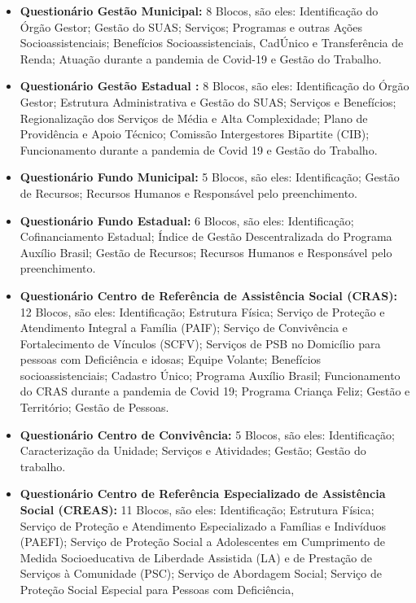 \documentclass[
  brazilian]{report}
\begin{document}
\begin{itemize}
\item
  \textbf{Questionário Gestão Municipal:} 8 Blocos, são eles:
  Identificação do Órgão Gestor; Gestão do SUAS; Serviços; Programas e
  outras Ações Socioassistenciais; Benefícios Socioassistenciais,
  CadÚnico e Transferência de Renda; Atuação durante a pandemia de
  Covid-19 e Gestão do Trabalho.
\item
  \textbf{Questionário Gestão Estadual :} 8 Blocos, são eles:
  Identificação do Órgão Gestor; Estrutura Administrativa e Gestão do
  SUAS; Serviços e Benefícios; Regionalização dos Serviços de Média e
  Alta Complexidade; Plano de Providência e Apoio Técnico; Comissão
  Intergestores Bipartite (CIB); Funcionamento durante a pandemia de
  Covid 19 e Gestão do Trabalho.
\item
  \textbf{Questionário Fundo Municipal:} 5 Blocos, são eles:
  Identificação; Gestão de Recursos; Recursos Humanos e Responsável pelo
  preenchimento.
\item
  \textbf{Questionário Fundo Estadual:} 6 Blocos, são eles:
  Identificação; Cofinanciamento Estadual; Índice de Gestão
  Descentralizada do Programa Auxílio Brasil; Gestão de Recursos;
  Recursos Humanos e Responsável pelo preenchimento.
\item
  \textbf{Questionário Centro de Referência de Assistência Social
  (CRAS):} 12 Blocos, são eles: Identificação; Estrutura Física; Serviço
  de Proteção e Atendimento Integral a Família (PAIF); Serviço de
  Convivência e Fortalecimento de Vínculos (SCFV); Serviços de PSB no
  Domicílio para pessoas com Deficiência e idosas; Equipe Volante;
  Benefícios socioassistenciais; Cadastro Único; Programa Auxílio
  Brasil; Funcionamento do CRAS durante a pandemia de Covid 19; Programa
  Criança Feliz; Gestão e Território; Gestão de Pessoas.
\item
  \textbf{Questionário Centro de Convivência:} 5 Blocos, são eles:
  Identificação; Caracterização da Unidade; Serviços e Atividades;
  Gestão; Gestão do trabalho.
\item
  \textbf{Questionário Centro de Referência Especializado de Assistência
  Social (CREAS):} 11 Blocos, são eles: Identificação; Estrutura Física;
  Serviço de Proteção e Atendimento Especializado a Famílias e
  Indivíduos (PAEFI); Serviço de Proteção Social a Adolescentes em
  Cumprimento de Medida Socioeducativa de Liberdade Assistida (LA) e de
  Prestação de Serviços à Comunidade (PSC); Serviço de Abordagem Social;
  Serviço de Proteção Social Especial para Pessoas com Deficiência,

\end{itemize}
\end{document}
